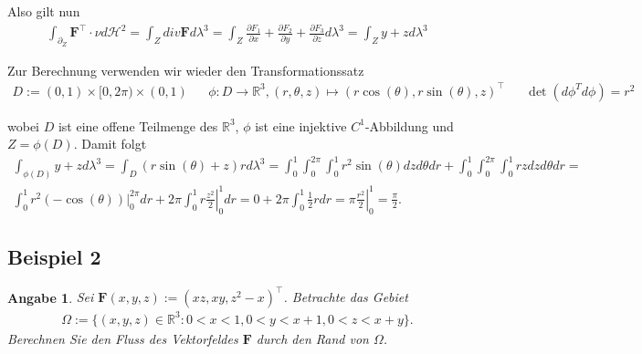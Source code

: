 \documentclass[]{article}
\newtheorem*{angabe*}{Angabe}
\begin{document}
\begin{enumerate}[label=(\roman*)]
	Also gilt nun
	\begin{align*}
		\int_{\partial_Z} \bm{F}^\top \cdot \nu d\mathcal{H}^2 = \int_Z div\bm{F} d\lambda^3 = \int_Z \frac{\partial F_1}{\partial x} + \frac{\partial F_2}{\partial y} + \frac{\partial F_3}{\partial z} d\lambda^3 = \int_Z y + z d\lambda^3
	\end{align*}

	Zur Berechnung verwenden wir wieder den Transformationssatz
	\begin{align*}
		D := (0,1)\times[0,2\pi)\times(0,1) && \phi:D\rightarrow\mathbb{R}^3, (r,\theta,z) \mapsto (r\cos(\theta), r\sin(\theta), z)^\top && \det(d\phi^T d\phi) = r^2
	\end{align*}

	wobei $D$ ist eine offene Teilmenge des $\mathbb{R}^3$, $\phi$ ist eine injektive $C^1$-Abbildung und $Z=\phi(D)$. Damit folgt 
	\begin{align*}
		\int_{\phi(D)} y + z d\lambda^3 = \int_D (r\sin(\theta) + z)r d\lambda^3 = \int_{0}^{1} \int_{0}^{2\pi} \int_{0}^{1} r^2 \sin(\theta) dz d\theta dr + \int_{0}^{1} \int_{0}^{2\pi} \int_{0}^{1} rz dz d\theta dr = \\
		\int_{0}^{1} r^2 \left.(-\cos(\theta))\right\vert_0^{2\pi} dr + 2\pi \int_{0}^{1} r \left. \frac{z^2}{2}\right\vert_0^1 dr = 0 + 2\pi \int_0^1 \frac{1}{2} r dr = \pi \left. \frac{r^2}{2}\right\vert_0^1 = \frac{\pi}{2}.
	\end{align*}

\end{enumerate}
\newpage

\subsection*{Beispiel 2}
\begin{angabe*}
	Sei $\bm{F}(x,y,z):=(xz, xy, z^2-x)^\top$. Betrachte das Gebiet
	\begin{align*}
		\Omega := \{(x,y,z)\in \mathbb{R}^3: 0<x<1, 0<y<x+1, 0<z<x+y\}.
	\end{align*}
	Berechnen Sie den Fluss des Vektorfeldes $\bm{F}$ durch den Rand von $\Omega$.
\end{angabe*}
\end{document}
